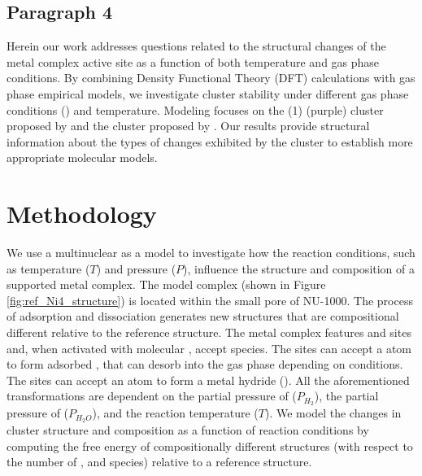 \documentclass[journal=jctcce,manuscript=article]{achemso}
\begin{document}
\subsection{Paragraph 4}
Herein our work addresses questions related to the structural changes of the metal complex active site as a function of both temperature and gas phase conditions. By combining Density Functional Theory (DFT) calculations with gas phase empirical models, we investigate cluster stability under different gas phase conditions () and temperature. Modeling focuses on the (1)  (purple) cluster proposed by \citeauthor{PlateroPrats2017} and the  cluster proposed by \cite{Ikuno2017}. Our results provide structural information about the types of changes exhibited by the cluster to establish more appropriate molecular models. 



\newpage

\section{Methodology}
We use a multinuclear  as a model to investigate how the reaction conditions, such as temperature ($T$) and pressure ($P$), influence the structure and composition of a supported metal complex. The model  complex (shown in Figure \ref{fig:ref_Ni4_structure}) is located within the small pore of NU-1000. The process of  adsorption and dissociation generates new structures that are compositional different relative to the reference structure. The metal complex features  and  sites and, when activated with molecular , accept  species. The  sites can accept a  atom to form adsorbed , that can desorb into the gas phase depending on conditions. The  sites can accept an  atom to form a metal hydride (). All the aforementioned transformations are dependent on the partial pressure of  ($P_{H_2}$), the partial pressure of  ($P_{H_{2}O}$), and the reaction temperature ($T$). We model the changes in cluster structure and composition as a function of reaction conditions by computing the free energy of compositionally different structures (with respect to the number of ,  and  species) relative to a reference structure. 
\end{document}
